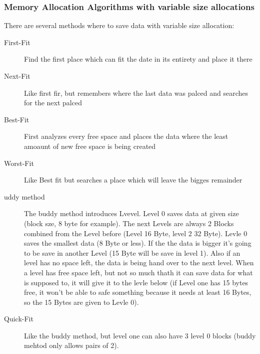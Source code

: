 \documentclass[a4paper]{scrartcl}
\begin{document}
            \subsubsection{Memory Allocation Algorithms with variable size allocations}
                There are several methods where to save data with variable size allocation: 
                \begin{description}
                    \item[First-Fit] Find the first place which can fit the date in its entirety and place it there
                    \item[Next-Fit] Like first fir, but remembers where the last data was palced and searches for the next palced
                    \item[Best-Fit] First analyzes every free space and places the data where the least amoaunt of new free space is being created
                    \item[Worst-Fit] Like Best fit but searches a place which will leave the bigges remainder
                    \item[uddy method] The buddy method introduces Lvevel. Level 0 saves data at given size (block sze, 8 byte for example). The next Levels are
                        always 2 Blocks combined from the Level before (Level 16 Byte, level 2 32 Byte). Levle 0 saves the smallest data (8 Byte or less). If the 
                        the data is bigger it's going to be save in another Level (15 Byte will be save in level 1). Also if an level has no space left, the 
                        data is being hand over to the next level. When a level has free space left, but not so much thath it can save data for what is supposed to, it will
                        give it to the levle below (if Level one has 15 bytes free, it won't be able to safe something because it needs at least 16 Bytes, so the 15 Bytes are 
                        given to Levle 0).    
                    \item[Quick-Fit] Like the buddy method, but level one can also have 3 level 0 blocks (buddy mehtod only allows pairs of 2). 
                \end{description}
            
\end{document}

